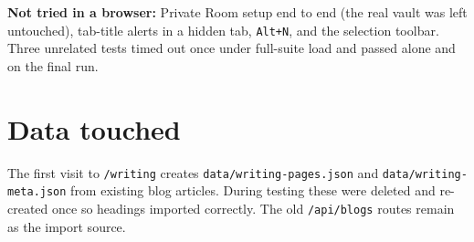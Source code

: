 \documentclass[11pt,a4paper]{article}
\begin{document}
\textbf{Not tried in a browser:} Private Room setup end to end (the real vault was left untouched), tab-title alerts in a hidden tab, \texttt{Alt+N}, and the selection toolbar. Three unrelated tests timed out once under full-suite load and passed alone and on the final run.

\section{Data touched}
The first visit to \texttt{/writing} creates \texttt{data/writing-pages.json} and \texttt{data/writing-meta.json} from existing blog articles. During testing these were deleted and re-created once so headings imported correctly. The old \texttt{/api/blogs} routes remain as the import source.
\end{document}
